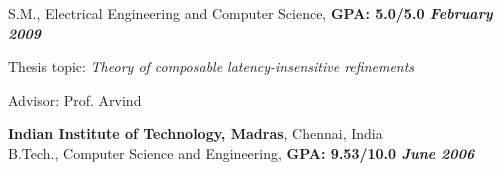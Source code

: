 \documentclass[margin]{resume}
\begin{document}
\begin{resume}
\begin{list2}
    \end{list2}%
    S.M., Electrical Engineering and Computer Science, \hfill \textbf{GPA: 5.0/5.0 \textit{February 2009}}\\
    \begin{list2}
        \item Thesis topic: \textit{Theory of composable latency-insensitive refinements}
        \item Advisor:  Prof. Arvind
    \end{list2}%
    \textbf{Indian Institute of Technology, Madras}, Chennai, India\\
    B.Tech., Computer Science and Engineering, \hfill \textbf{GPA: 9.53/10.0 \textit{June 2006}}\\



\end{resume}
\end{document}

